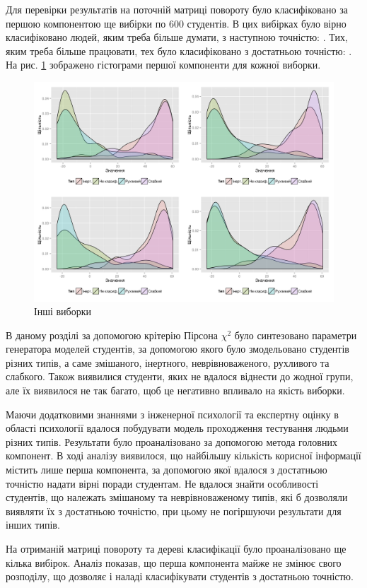 Для перевірки результатів на поточній матриці повороту було класифіковано
за першою компонентою ще вибірки по $600$ студентів.
В цих вибірках було вірно класифіковано людей, яким треба більше думати,
з наступною точністю: \testThinkersPredictionQuality.
Тих, яким треба більше працювати, тех було класифіковано з достатньою
точністю: \testLearnersPredictionQuality.
На рис. \ref{fig:tree:test} зображено гістограми першої компоненти
для кожної виборки.

\begin{figure}[h]
  \centering
    \includegraphics[width=\textwidth]{images/pca_hists_test}
  \caption{Інші виборки}
  \label{fig:tree:test}
\end{figure}

\chapterConclusion

В даному розділі за допомогою крітерію Пірсона $\chi^2$ було синтезовано
параметри генератора моделей студентів, за допомогою якого було змодельовано
студентів різних типів, а саме змішаного, інертного, неврівноваженого,
рухливого та слабкого.
Також виявилися студенти, яких не вдалося віднести до жодної групи,
але їх виявилося не так багато, щоб це негативно впливало на якість виборки.

Маючи додатковими знаннями з інженерної психології та експертну оцінку
в області психології вдалося побудувати модель проходження тестування
людьми різних типів.
Результати було проаналізовано за допомогою метода головних компонент.
В ході аналізу виявилося, що найбільшу кількість корисної інформації
містить лише перша компонента, за допомогою якої вдалося з достатньою
точністю надати вірні поради студентам.
Не вдалося знайти особливості студентів, що належать змішаному та
неврівноваженому типів, які б дозволяли виявляти їх з достатньою точністю,
при цьому не погіршуючи результати для інших типів.

На отриманій матриці повороту та дереві класифікації було проаналізовано
ще кілька вибірок.
Аналіз показав, що перша компонента майже не змінює свого розподілу, що
дозволяє і наладі класифікувати студентів з достатньою точністю.
